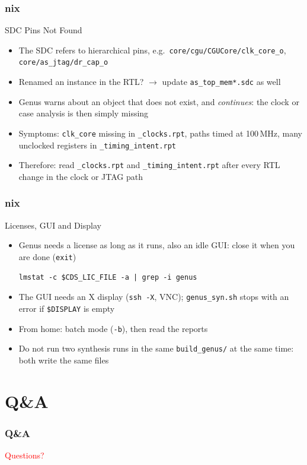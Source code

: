 \documentclass{beamer}
\newcommand{\astitle}{nix}
\newcommand{\assubtitle}{nix}
\newcommand{\cmd}[1]{\texttt{#1}}
\begin{document}
\renewcommand{\assubtitle}{SDC Pins Not Found}
\begin{frame}
\frametitle{\astitle}
\begin{block}{\assubtitle}
  \begin{itemize}
    \item The SDC refers to hierarchical pins, e.g.\
      \cmd{core/cgu/CGUCore/clk\_core\_o}, \cmd{core/as\_jtag/dr\_cap\_o}
    \item Renamed an instance in the RTL? $\rightarrow$ update
      \cmd{as\_top\_mem*.sdc} as well
    \item Genus warns about an object that does not exist, and \emph{continues}:
      the clock or case analysis is then simply missing
    \item Symptoms: \cmd{clk\_core} missing in \cmd{\_clocks.rpt}, paths timed at
      100\,MHz, many unclocked registers in \cmd{\_timing\_intent.rpt}
    \item Therefore: read \cmd{\_clocks.rpt} and \cmd{\_timing\_intent.rpt}
      after every RTL change in the clock or JTAG path
  \end{itemize}
\end{block}
\end{frame}

\renewcommand{\assubtitle}{Licenses, GUI and Display}
\begin{frame}[fragile]
\frametitle{\astitle}
\begin{block}{\assubtitle}
  \begin{itemize}
    \item Genus needs a license as long as it runs, also an idle GUI:
      close it when you are done (\cmd{exit})
\begin{lstlisting}[style=sh]
lmstat -c $CDS_LIC_FILE -a | grep -i genus
\end{lstlisting}
    \item The GUI needs an X display (\cmd{ssh -X}, VNC);
      \cmd{genus\_syn.sh} stops with an error if \cmd{\$DISPLAY} is empty
    \item From home: batch mode (\cmd{-b}), then read the reports
    \item Do not run two synthesis runs in the same \cmd{build\_genus/}
      at the same time: both write the same files
  \end{itemize}
\end{block}
\end{frame}

\section{Q\&A}
\renewcommand{\astitle}{Q\&A}
\begin{frame}
\frametitle{\astitle}
\vfill
\centering
\begin{Huge}\textcolor{red}{Questions?}\end{Huge}
\vfill
\end{frame}
\end{document}
